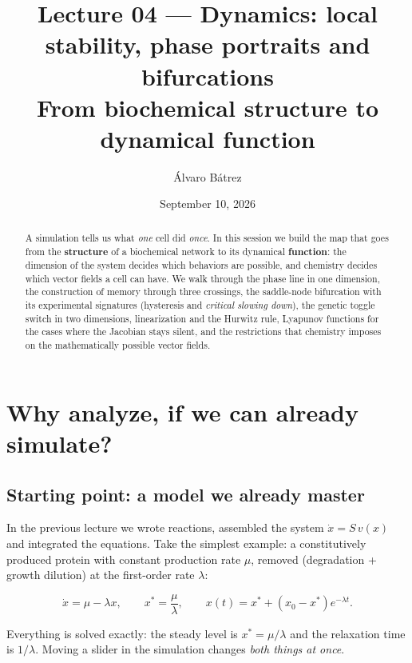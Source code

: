 \documentclass[12pt]{article}
\title{Lecture 04 --- Dynamics: local stability, phase portraits and bifurcations\\
\large From biochemical structure to dynamical function}
\author{Álvaro Bátrez}
\date{September 10, 2026}
\begin{document}
\maketitle

\begin{abstract}
\noindent A simulation tells us what \emph{one} cell did \emph{once}. In this session
we build the map that goes from the \textbf{structure} of a biochemical network to
its dynamical \textbf{function}: the dimension of the system decides which behaviors
are possible, and chemistry decides which vector fields a cell can have. We walk
through the phase line in one dimension, the construction of memory through three
crossings, the saddle-node bifurcation with its experimental signatures (hysteresis
and \emph{critical slowing down}), the genetic toggle switch in two dimensions,
linearization and the Hurwitz rule, Lyapunov functions for the cases where the
Jacobian stays silent, and the restrictions that chemistry imposes on the
mathematically possible vector fields.
\end{abstract}

\tableofcontents

\newpage

\section{Why analyze, if we can already simulate?}

\subsection{Starting point: a model we already master}

In the previous lecture we wrote reactions, assembled the system
$\dot{x} = S\,v(x)$ and integrated the equations. Take the simplest example:
a constitutively produced protein with constant production rate $\mu$, removed
(degradation + growth dilution) at the first-order rate $\lambda$:

\begin{equation}
\dot{x} = \mu - \lambda x,
\qquad
x^{*} = \frac{\mu}{\lambda},
\qquad
x(t) = x^{*} + \left(x_0 - x^{*}\right) e^{-\lambda t}.
\label{eq:constitutive}
\end{equation}

Everything is solved exactly: the steady level is $x^{*} = \mu/\lambda$ and the
relaxation time is $1/\lambda$. Moving a slider in the simulation changes
\emph{both things at once}.
\end{document}
